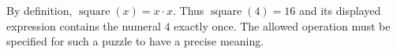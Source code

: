 By definition, $\operatorname{square}(x)=x\cdot x$. Thus $\boxed{\operatorname{square}(4)}=16$ and its displayed expression contains the numeral $4$ exactly once. The allowed operation must be specified for such a puzzle to have a precise meaning.
